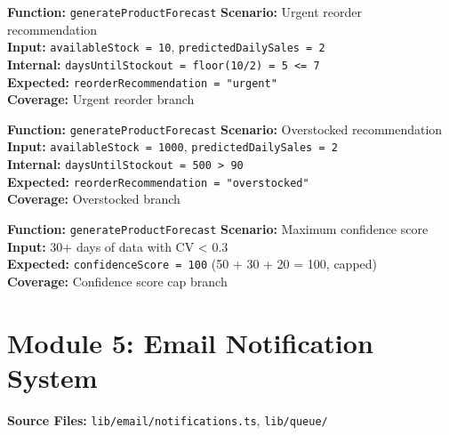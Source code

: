 \documentclass[12pt,a4paper]{report}
\newcommand{\ptwo}{\textbf{\color{p2orange}P2}}
\newcommand{\pthree}{\textbf{\color{p3blue}P3}}
\begin{document}
\begin{tcolorbox}[testbox,title={FORE-013 \hfill \ptwo}]
\textbf{Function:} \texttt{generateProductForecast} \quad \textbf{Scenario:} Urgent reorder recommendation \\
\textbf{Input:} \texttt{availableStock = 10}, \texttt{predictedDailySales = 2} \\
\textbf{Internal:} \texttt{daysUntilStockout = floor(10/2) = 5 <= 7} \\
\textbf{Expected:} \texttt{reorderRecommendation = "urgent"} \\
\textbf{Coverage:} Urgent reorder branch
\end{tcolorbox}

\begin{tcolorbox}[testbox,title={FORE-014 \hfill \ptwo}]
\textbf{Function:} \texttt{generateProductForecast} \quad \textbf{Scenario:} Overstocked recommendation \\
\textbf{Input:} \texttt{availableStock = 1000}, \texttt{predictedDailySales = 2} \\
\textbf{Internal:} \texttt{daysUntilStockout = 500 > 90} \\
\textbf{Expected:} \texttt{reorderRecommendation = "overstocked"} \\
\textbf{Coverage:} Overstocked branch
\end{tcolorbox}

\begin{tcolorbox}[testbox,title={FORE-015 \hfill \pthree}]
\textbf{Function:} \texttt{generateProductForecast} \quad \textbf{Scenario:} Maximum confidence score \\
\textbf{Input:} 30+ days of data with CV < 0.3 \\
\textbf{Expected:} \texttt{confidenceScore = 100} (50 + 30 + 20 = 100, capped) \\
\textbf{Coverage:} Confidence score cap branch
\end{tcolorbox}

\section{Module 5: Email Notification System}

\textbf{Source Files:} \texttt{lib/email/notifications.ts}, \texttt{lib/queue/}
\end{document}
